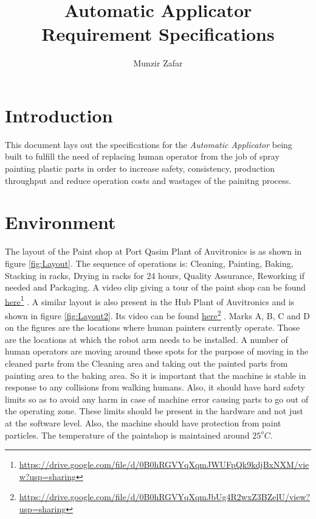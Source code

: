 \documentclass[a4paper,10pt]{article}
\title{Automatic Applicator\\Requirement Specifications}
\author{Munzir Zafar}
\newcommand\fnurl[2]{%
  \href{#1}{#2}\footnote{\url{#1}}%
}
\begin{document}
\maketitle

\section{Introduction}
This document lays out the specifications for the \emph{Automatic Applicator} being built to fulfill
the need of replacing human operator from the job of spray painting plastic parts in order to increase
safety, consistency, production throughput and reduce operation costs and wastages of the painitng process. 

\section{Environment}
The layout of the Paint shop at Port Qasim Plant of Auvitronics is as shown in figure \ref{fig:Layout}. The sequence of operations is: 
 Cleaning, Painting, Baking, Stacking in racks, Drying in racks for 24 hours, Quality Assurance,
 Reworking if needed and Packaging. A video clip giving a tour of the paint shop can be found \fnurl{https://drive.google.com/file/d/0B0hRGVYqXqmJWUFpQk9kdjBxNXM/view?usp=sharing}{here}.
 A similar layout is also present in the Hub Plant of Auvitronics and is shown in figure \ref{fig:Layout2}. Its video can be found \fnurl{https://drive.google.com/file/d/0B0hRGVYqXqmJbUg4R2wxZ3BZelU/view?usp=sharing}{here}.
 Marks A, B, C and D on the figures are the locations where human painters currently operate.
 Those are the locations at which the robot arm needs to be installed. A number of human operators are moving around these spots
 for the purpose of moving in the cleaned parts from the Cleaning area and taking out the painted parts from painting area to
 the baking area. So it is important that the machine is stable in response to any collisions from walking humans. Also, it
 should have hard safety limits so as to avoid any harm in case of machine error causing parts to go out of the operating zone.
 These limits should be present in the hardware and not just at the software level. Also, the machine should have protection 
 from paint particles. The temperature of the paintshop is maintained around $25^oC$.
\end{document}
